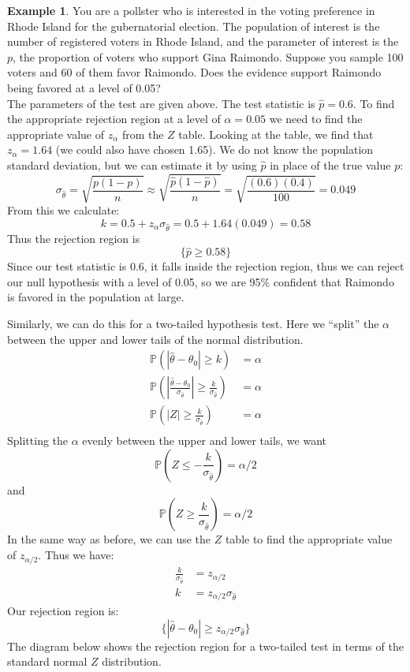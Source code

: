 \documentclass[12pt]{article}
\theoremstyle{definition}
\newtheorem*{example}{Example}
\theoremstyle{remark}
\def\P{{\mathbb P}}
\begin{document}
\begin{example}
You are a pollster who is interested in the voting preference in Rhode Island for the gubernatorial election. The population of interest is the number of registered voters in Rhode Island, and the parameter of interest is the $p$, the proportion of voters who support Gina Raimondo. Suppose you sample 100 voters and 60 of them favor Raimondo. Does the evidence support Raimondo being favored at a level of 0.05?\\

The parameters of the test are given above. The test statistic is $\hat{p} = 0.6$. To find the appropriate rejection region at a level of $\alpha = 0.05$ we need to find the appropriate value of $z_\alpha$ from the $Z$ table. Looking at the table, we find that $z_\alpha = 1.64$ (we could also have chosen 1.65). We do not know the population standard deviation, but we can estimate it by using $\hat{p}$ in place of the true value $p$:
\[
\sigma_{\hat{\theta}} = \sqrt{ \frac{p(1-p)}{n} } \approx \sqrt{ \frac{\hat{p}(1-\hat{p})}{n} } = \sqrt{ \frac{(0.6)(0.4)}{100}} = 0.049
\] 
From this we calculate:
\[
k = 0.5 + z_\alpha \sigma_{\hat{\theta}} = 0.5 + 1.64 (0.049) = 0.58
\]
Thus the rejection region is
\[
\{ \hat{p} \geq 0.58 \}
\]
Since our test statistic is 0.6, it falls inside the rejection region, thus we can reject our null hypothesis with a level of 0.05, so we are 95\% confident that Raimondo is favored in the population at large.
\end{example}

Similarly, we can do this for a two-tailed hypothesis test. Here we ``split'' the $\alpha$ between the upper and lower tails of the normal distribution.
\begin{align*}
\P(|\hat{\theta} - \theta_0 | \geq k) &= \alpha \\
\P\left(\left|\frac{ \hat{\theta} - \theta_0 }{ \sigma_{\hat{\theta}} } \right| \geq \frac{k}{\sigma_{\hat{\theta}}} \right) &= \alpha \\
\P\left( |Z| \geq \frac{k}{\sigma_{\hat{\theta}}} \right) &= \alpha \\
\end{align*}
Splitting the $\alpha$ evenly between the upper and lower tails, we want
\[
\P\left(Z \leq -\frac{k}{\sigma_{\hat{\theta}}} \right) = \alpha / 2
\]
and
\[
\P\left(Z \geq \frac{k}{\sigma_{\hat{\theta}}} \right) = \alpha / 2
\]
In the same way as before, we can use the $Z$ table to find the appropriate value of $z_{\alpha/2}$. Thus we have:
\begin{align*}
\frac{k}{\sigma_{\hat{\theta}}} &= z_{\alpha/2}\\
k &= z_{\alpha/2} \sigma_{\hat{\theta}}
\end{align*}
Our rejection region is:
\[
\{ |\hat{\theta} - \theta_0| \geq  z_{\alpha/2} \sigma_{\hat{\theta}} \}
\]
The diagram below shows the rejection region for a two-tailed test in terms of the standard normal $Z$ distribution.
\end{document}
